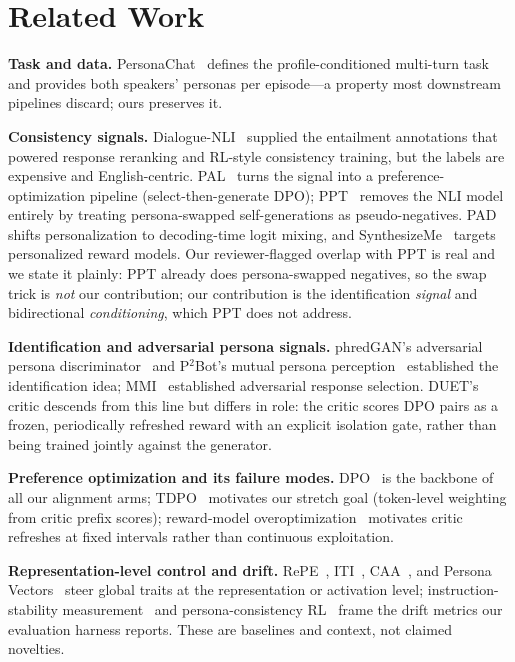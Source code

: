 \documentclass[lettersize,journal]{IEEEtran}
\begin{document}
\section{Related Work}
\label{sec:related}
\textbf{Task and data.} PersonaChat~\cite{zhang2018personachat} defines the
profile-conditioned multi-turn task and provides both speakers' personas per
episode---a property most downstream pipelines discard; ours preserves it.

\textbf{Consistency signals.} Dialogue-NLI~\cite{welleck2019dnli} supplied the
entailment annotations that powered response reranking and RL-style consistency
training, but the labels are expensive and English-centric.
PAL~\cite{li2025pal} turns the signal into a preference-optimization pipeline
(select-then-generate DPO); PPT~\cite{takayama2025ppt} removes the NLI model
entirely by treating persona-swapped self-generations as pseudo-negatives.
PAD~\cite{chen2025pad} shifts personalization to decoding-time logit mixing, and
SynthesizeMe~\cite{ryan2025synthesizeme} targets personalized reward models. Our
reviewer-flagged overlap with PPT is real and we state it plainly: PPT already
does persona-swapped negatives, so the swap trick is \emph{not} our contribution;
our contribution is the identification \emph{signal} and bidirectional
\emph{conditioning}, which PPT does not address.

\textbf{Identification and adversarial persona signals.} phredGAN's adversarial
persona discriminator~\cite{olabiyi2019phredgan} and P$^2$Bot's mutual persona
perception~\cite{liu2020p2bot} established the identification idea;
MMI~\cite{li2016mmi} established adversarial response selection. DUET's critic
descends from this line but differs in role: the critic scores DPO pairs as a
frozen, periodically refreshed reward with an explicit isolation gate, rather
than being trained jointly against the generator.

\textbf{Preference optimization and its failure modes.} DPO~\cite{rafailov2023dpo}
is the backbone of all our alignment arms; TDPO~\cite{zeng2024tdpo} motivates
our stretch goal (token-level weighting from critic prefix scores); reward-model
overoptimization~\cite{gao2023overopt} motivates critic refreshes at fixed
intervals rather than continuous exploitation.

\textbf{Representation-level control and drift.} RePE~\cite{zou2023repe},
ITI~\cite{li2023iti}, CAA~\cite{rimsky2024caa}, and Persona
Vectors~\cite{chen2025personavectors} steer global traits at the representation
or activation level; instruction-stability measurement~\cite{li2024instability}
and persona-consistency RL~\cite{abdulhai2025personaconsistency} frame the
drift metrics our evaluation harness reports. These are baselines and context,
not claimed novelties.
\end{document}
